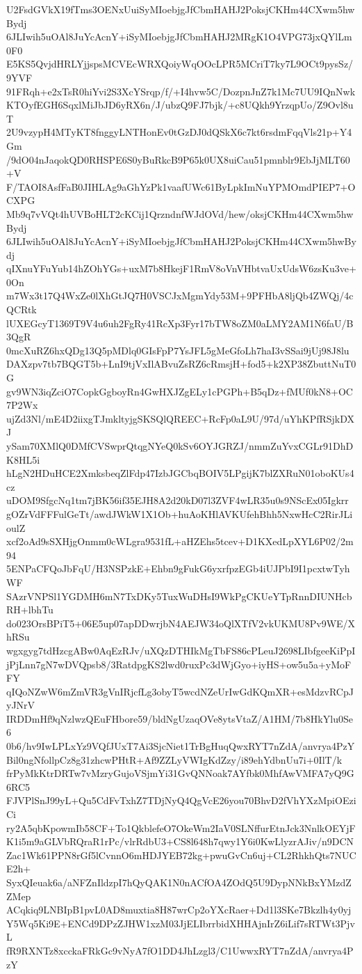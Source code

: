 U2FsdGVkX19fTms3OENxUuiSyMIoebjgJfCbmHAHJ2PoksjCKHm44CXwm5hwBydj
6JLIwih5uOAl8JuYcAcnY+iSyMIoebjgJfCbmHAHJ2MRgK1O4VPG73jxQYlLm0F0
E5KS5QvjdHRLYjjspsMCVEcWRXQoiyWqOOcLPR5MCriT7ky7L9OCt9pysSz/9YVF
91FRqh+e2xTsR0hiYvi2S3XcYSrqp/f/+I4hvw5C/DozpnJnZ7k1Mc7UU9IQnNwk
KTOyfEGH6SqxlMiJbJD6yRX6n/J/ubzQ9FJ7bjk/+c8UQkh9YrzqpUo/Z9Ovl8uT
2U9vzypH4MTyKT8fnggyLNTHonEv0tGzDJ0dQSkX6c7kt6rsdmFqqVls21p+Y4Gm
/9dO04nJaqokQD0RHSPE6S0yBuRkcB9P65k0UX8uiCau51pmnblr9EbJjMLT60+V
F/TAOI8AsfFaB0JIHLAg9aGhYzPk1vaafUWc61ByLpkImNuYPMOmdPIEP7+OCXPG
Mb9q7vVQt4hUVBoHLT2cKCij1QrzndnfWJdOVd/hew/oksjCKHm44CXwm5hwBydj
6JLIwih5uOAl8JuYcAcnY+iSyMIoebjgJfCbmHAHJ2PoksjCKHm44CXwm5hwBydj
qIXnuYFuYub14hZOhYGs+uxM7b8HkejF1RmV8oVnVHbtvaUxUdsW6zsKu3ve+0On
m7Wx3t17Q4WxZe0lXhGtJQ7H0VSCJxMgmYdy53M+9PFHbA8ljQb4ZWQj/4cQCRtk
lUXEGcyT1369T9V4u6uh2FgRy41RcXp3Fyr17bTW8oZM0aLMY2AM1N6faU/B3QgR
0mcXuRZ6hxQDg13Q5pMDlq0GIsFpP7YsJFL5gMeGfoLh7haI3vSSai9jUj98J8lu
DAXzpv7tb7BQGT5b+LnI9tjVxIlABvuZsRZ6cRmsjH+fod5+k2XP38ZbuttNuT0G
gv9WN3iqZciO7CopkGgboyRn4GwHXJZgELy1cPGPh+B5qDz+fMUf0kN8+OC7P2Wx
ujZd3Nl/mE4D2iixgTJmkltyjgSKSQlQREEC+RcFp0aL9U/97d/uYhKPfRSjkDXJ
ySam70XMlQ0DMfCVSwprQtqgNYeQ0kSv6OYJGRZJ/nmmZuYvxCGLr91DhDK8HL5i
hLgN2HDuHCE2XmksbeqZlFdp47IzbJGCbqBOIV5LPgijK7blZXRuN01oboKUs4cz
uDOM9SfgcNq1tm7jBK56if35EJH8A2d20kD07l3ZVF4wLR35u0s9NScEx05Igkrr
gOZrVdFFFulGeTt/awdJWkW1X1Ob+huAoKHlAVKUfehBhh5NxwHcC2RirJLioulZ
xcf2oAd9sSXHjgOnmm0cWLgra9531fL+aHZEhs5tcev+D1KXedLpXYL6P02/2m94
5ENPaCFQoJbFqU/H3NSPzkE+Ehbn9gFukG6yxrfpzEGb4iUJPbI9I1pcxtwTyhWF
SAzrVNPSl1YGDMH6mN7TxDKy5TuxWuDHsI9WkPgCKUeYTpRnnDIUNHcbRH+lbhTu
do023OrsBPiT5+06E5up07apDDwrjbN4AEJW34oQlXTfV2vkUKMU8Pv9WE/XhRSu
wgxgyg7tdHzcgABw0AqEzRJv/uXQzDTHIkMgTbFS86cPLeuJ2698LIbfgeeKiPpI
jPjLnn7gN7wDVQpsb8/3RatdpgKS2lwd0ruxPc3dWjGyo+iyHS+ow5u5a+yMoFFY
qIQoNZwW6mZmVR3gVnIRjcfLg3obyT5wcdNZeUrIwGdKQmXR+esMdzvRCpJyJNrV
IRDDmHf9qNzlwzQEuFHbore59/bldNgUzaqOVe8ytsVtaZ/A1HM/7b8HkYlu0Se6
0b6/hv9IwLPLxYz9VQfJUxT7Ai3SjcNiet1TrBgHuqQwxRYT7nZdA/anvrya4PzY
Bil0ngNfollpCz8g31zhcwPHtR+Af9ZZLyVWIgKdZzy/i89ehYdbnUu7i+0IlT/k
frPyMkKtrDRTw7vMzryGujoVSjmYi31GvQNNoak7AYfbk0MhfAwVMFA7yQ9G6RC5
FJVPlSnJ99yL+Qu5CdFvTxhZ7TDjNyQ4QgVcE26you70BhvD2fVhYXzMpiOEziCi
ry2A5qbKpowmIb58CF+To1QkblefeO7OkeWm2IaV0SLNffurEtnJck3NnlkOEYjF
K1i5m9aGLVbRQraR1rPc/vlrRdbU3+CS8l648h7qwy1Y6i0KwLlyzrAJiv/n9DCN
Zac1Wk61PPN8rGf5lCvnnO6mHDJYEB72kg+pwuGvCn6uj+CL2RhkhQts7NUCE2h+
SyxQIeuak6a/aNFZnIldzpI7hQyQAK1N0nACfOA4ZOdQ5U9DypNNkBxYMzdZZMep
ACqkiq9LNBIpB1pvL0AD8muxtia8H87wrCp2oYXcRaer+Dd1l3SKe7Bkzlh4y0yj
Y5Wq5Ki9E+ENCd9DPzZJHW1xzM03JjELIbrrbidXHHAjnIrZ6iLif7sRTWt3PjvL
fR9RXNTz8xcckaFRkGc9vNyA7fO1DD4JhLzgl3/C1UwwxRYT7nZdA/anvrya4PzY

